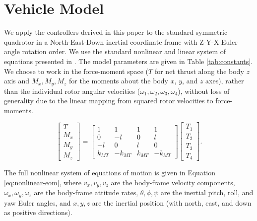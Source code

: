 \documentclass[conf]{new-aiaa}
\begin{document}
\section{Vehicle Model}
We apply the controllers derived in this paper to the standard symmetric quadrotor in a North-East-Down inertial coordinate frame with Z-Y-X Euler angle rotation order. We use the standard nonlinear and linear system of equations presented in \cite{refs:Tahir2020}. The model parameters are given in Table \ref{tab:constants}. We choose to work in the force-moment space ($T$ for net thrust along the body $z$ axis and $M_x, M_y, M_z$ for the moments about the body $x$, $y$, and $z$ axes), rather than the individual rotor angular velocities ($\omega_1, \omega_2, \omega_3, \omega_4$), without loss of generality due to the linear mapping from squared rotor velocities to force-moments.

\begin{equation}
\label{eq:thrusts}
\begin{bmatrix}
T \\ M_x \\ M_y \\ M_z
\end{bmatrix}
=
\begin{bmatrix}
1 & 1 & 1 & 1 \\
0 & -l & 0 & l \\
-l & 0 & l & 0 \\
k_{MT} & -k_{MT} & k_{MT} & -k_{MT}
\end{bmatrix}
\begin{bmatrix}
T_1 \\ T_2 \\ T_3 \\ T_4
\end{bmatrix}.
\end{equation}

The full nonlinear system of equations of motion is given in Equation \ref{eq:nonlinear-eom}, where $v_x, v_y, v_z$ are the body-frame velocity components, $\omega_x, \omega_y, \omega_z$ are the body-frame attitude rates, $\theta, \phi, \psi$ are the inertial pitch, roll, and yaw Euler angles, and $x, y, z$ are the inertial position (with north, east, and down as positive directions).
\end{document}
